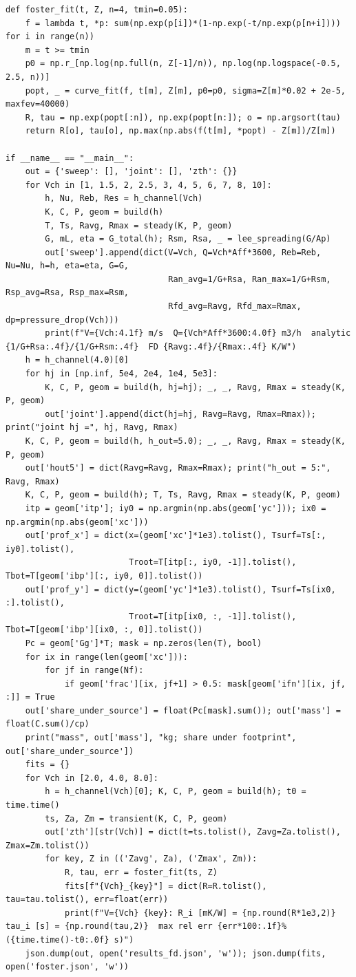\documentclass[11pt,a4paper]{article}
\begin{document}
\begin{lstlisting}
def foster_fit(t, Z, n=4, tmin=0.05):
    f = lambda t, *p: sum(np.exp(p[i])*(1-np.exp(-t/np.exp(p[n+i]))) for i in range(n))
    m = t >= tmin
    p0 = np.r_[np.log(np.full(n, Z[-1]/n)), np.log(np.logspace(-0.5, 2.5, n))]
    popt, _ = curve_fit(f, t[m], Z[m], p0=p0, sigma=Z[m]*0.02 + 2e-5, maxfev=40000)
    R, tau = np.exp(popt[:n]), np.exp(popt[n:]); o = np.argsort(tau)
    return R[o], tau[o], np.max(np.abs(f(t[m], *popt) - Z[m])/Z[m])

if __name__ == "__main__":
    out = {'sweep': [], 'joint': [], 'zth': {}}
    for Vch in [1, 1.5, 2, 2.5, 3, 4, 5, 6, 7, 8, 10]:
        h, Nu, Reb, Res = h_channel(Vch)
        K, C, P, geom = build(h)
        T, Ts, Ravg, Rmax = steady(K, P, geom)
        G, mL, eta = G_total(h); Rsm, Rsa, _ = lee_spreading(G/Ap)
        out['sweep'].append(dict(V=Vch, Q=Vch*Aff*3600, Reb=Reb, Nu=Nu, h=h, eta=eta, G=G,
                                 Ran_avg=1/G+Rsa, Ran_max=1/G+Rsm, Rsp_avg=Rsa, Rsp_max=Rsm,
                                 Rfd_avg=Ravg, Rfd_max=Rmax, dp=pressure_drop(Vch)))
        print(f"V={Vch:4.1f} m/s  Q={Vch*Aff*3600:4.0f} m3/h  analytic {1/G+Rsa:.4f}/{1/G+Rsm:.4f}  FD {Ravg:.4f}/{Rmax:.4f} K/W")
    h = h_channel(4.0)[0]
    for hj in [np.inf, 5e4, 2e4, 1e4, 5e3]:
        K, C, P, geom = build(h, hj=hj); _, _, Ravg, Rmax = steady(K, P, geom)
        out['joint'].append(dict(hj=hj, Ravg=Ravg, Rmax=Rmax)); print("joint hj =", hj, Ravg, Rmax)
    K, C, P, geom = build(h, h_out=5.0); _, _, Ravg, Rmax = steady(K, P, geom)
    out['hout5'] = dict(Ravg=Ravg, Rmax=Rmax); print("h_out = 5:", Ravg, Rmax)
    K, C, P, geom = build(h); T, Ts, Ravg, Rmax = steady(K, P, geom)
    itp = geom['itp']; iy0 = np.argmin(np.abs(geom['yc'])); ix0 = np.argmin(np.abs(geom['xc']))
    out['prof_x'] = dict(x=(geom['xc']*1e3).tolist(), Tsurf=Ts[:, iy0].tolist(),
                         Troot=T[itp[:, iy0, -1]].tolist(), Tbot=T[geom['ibp'][:, iy0, 0]].tolist())
    out['prof_y'] = dict(y=(geom['yc']*1e3).tolist(), Tsurf=Ts[ix0, :].tolist(),
                         Troot=T[itp[ix0, :, -1]].tolist(), Tbot=T[geom['ibp'][ix0, :, 0]].tolist())
    Pc = geom['Gg']*T; mask = np.zeros(len(T), bool)
    for ix in range(len(geom['xc'])):
        for jf in range(Nf):
            if geom['frac'][ix, jf+1] > 0.5: mask[geom['ifn'][ix, jf, :]] = True
    out['share_under_source'] = float(Pc[mask].sum()); out['mass'] = float(C.sum()/cp)
    print("mass", out['mass'], "kg; share under footprint", out['share_under_source'])
    fits = {}
    for Vch in [2.0, 4.0, 8.0]:
        h = h_channel(Vch)[0]; K, C, P, geom = build(h); t0 = time.time()
        ts, Za, Zm = transient(K, C, P, geom)
        out['zth'][str(Vch)] = dict(t=ts.tolist(), Zavg=Za.tolist(), Zmax=Zm.tolist())
        for key, Z in (('Zavg', Za), ('Zmax', Zm)):
            R, tau, err = foster_fit(ts, Z)
            fits[f"{Vch}_{key}"] = dict(R=R.tolist(), tau=tau.tolist(), err=float(err))
            print(f"V={Vch} {key}: R_i [mK/W] = {np.round(R*1e3,2)}  tau_i [s] = {np.round(tau,2)}  max rel err {err*100:.1f}%  ({time.time()-t0:.0f} s)")
    json.dump(out, open('results_fd.json', 'w')); json.dump(fits, open('foster.json', 'w'))
\end{lstlisting}
\end{document}
